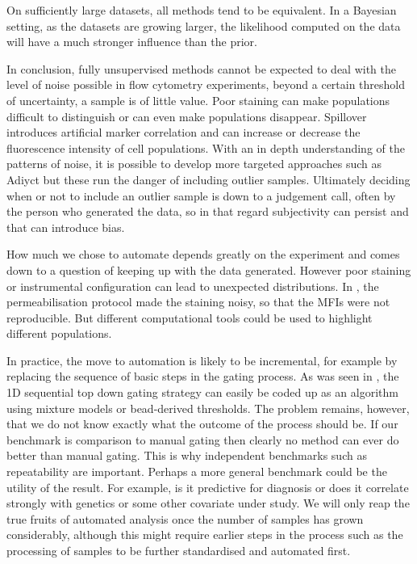 On sufficiently large datasets, all methods tend to be equivalent.
In a Bayesian setting, as the datasets are growing larger, the likelihood computed on the data will have a much stronger influence than the prior.

In conclusion, fully unsupervised methods cannot be expected to deal with the level of noise possible in flow cytometry experiments, beyond a certain threshold of uncertainty, a sample is of little value.
Poor staining can make populations difficult to distinguish or can even make populations disappear.
Spillover introduces artificial marker correlation and can increase or decrease the fluorescence intensity of cell populations.  
With an in depth understanding of the patterns of noise, it is possible to develop more targeted approaches such as Adiyct but these run the danger of including outlier samples.
Ultimately deciding when or not to include an outlier sample is down to a judgement call, often by the person who generated the data, so in that regard subjectivity can persist and that can introduce bias.


How much we chose to automate depends greatly on the experiment and comes down to a question of keeping up with the data generated.
However poor staining or instrumental configuration can lead to unexpected distributions.
In , the permeabilisation protocol made the staining noisy, so that the MFIs were not reproducible.
But different computational tools could be used to highlight different populations.

In practice, the move to automation is likely to be incremental, for example by replacing the sequence of basic steps in the gating process.
As was seen in , the 1D sequential top down gating strategy can easily be coded up as an algorithm using mixture models or bead-derived thresholds.  
The problem remains, however, that we do not know exactly what the outcome of the process should be.
If our benchmark is comparison to manual gating then clearly no method can ever do better than manual gating.
This is why independent benchmarks such as repeatability are important.
Perhaps a more general benchmark could be the utility of the result.
For example, is it predictive for diagnosis or does it correlate strongly with genetics or some other covariate under study.
We will only reap the true fruits of automated analysis once the number of samples has grown considerably, although this might require earlier steps in the process such as the processing of samples to be further standardised and automated first.

